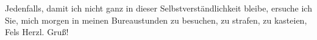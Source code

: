 \pstart
           Jedenfalls, damit ich nicht ganz in dieser Selbstverständlichkeit bleibe, ersuche ich
               Sie, mich morgen in meinen Bureaustunden zu besuchen, zu strafen, zu kasteien,\pend
           \pstart \spacefill\mbox{Fels}\pend{}
\pstart
           \noindent{}Herzl. Gruß!\pend
           \endnumbering{}  \newcommand{\dateiname}{L00160}\newcommand{\titel}{Friedrich M. Fels an Arthur Schnitzler, [20. 1. 1893]}\newcommand{\editorInnen}{Martin Anton Müller und Gerd-Hermann Susen}
